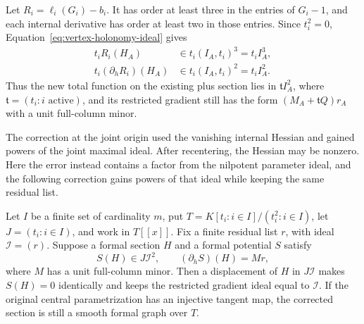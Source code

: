 Let $R_i=\ell_i(G_i)-b_i$.  It has order at least three in the entries
of $G_i-1$, and each internal derivative has order at least two in
those entries.  Since $t_i^2=0$, Equation~\eqref{eq:vertex-holonomy-ideal} gives
\begin{align}
 t_iR_i(H_A)&\in t_i(I_A,t_i)^3=t_iI_A^3,\label{eq:vertex-taylor-value}\\
 t_i(\partial_hR_i)(H_A)&\in t_i(I_A,t_i)^2=t_iI_A^2.
                                                        \label{eq:vertex-taylor-gradient}
\end{align}
Thus the new total function on the existing plus section lies in
$\mathfrak t I_A^2$, where $\mathfrak t=(t_i:i\text{ active})$, and
its restricted gradient still has the form
$(M_A+\mathfrak t Q)r_A$ with a unit full-column minor.

The correction at the joint origin used the vanishing internal Hessian
and gained powers of the joint maximal ideal.  After recentering, the
Hessian may be nonzero.  Here the error instead contains a factor from
the nilpotent parameter ideal, and the following correction gains powers
of that ideal while keeping the same residual list.

\begin{lemma}
\label{lem:tensor-nilpotent-correction}
Let \(I\) be a finite set of cardinality \(m\), put
\(T=K[t_i:i\in I]/(t_i^2:i\in I)\), let \(J=(t_i:i\in I)\), and
work in \(T[[x]]\).  Fix a finite residual list \(r\), with ideal
\(\mathcal I=(r)\).
Suppose a formal section \(H\) and a formal potential \(S\) satisfy
\[
 S(H)\in J\mathcal I^2,\qquad
               (\partial_h S)(H)=M r,
\]
where \(M\) has a unit full-column minor.
Then a displacement of \(H\) in \(J\mathcal I\) makes \(S(H)=0\)
identically and keeps the restricted gradient ideal equal to
\(\mathcal I\).
If the original central parametrization has an injective tangent map,
the corrected section is still a smooth formal graph over \(T\).
\end{lemma}

